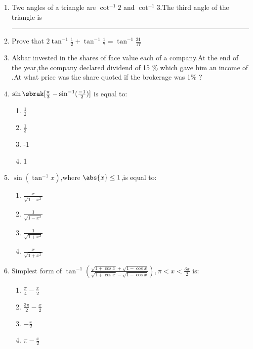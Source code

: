
\begin{enumerate}
\item Two angles of a triangle are  $\cot^{-1}2$ and $\cot^{-1}3$.The third angle of the
triangle is \rule{30pt}{1pt}

\item Prove that $2\tan^{-1}\frac{1}{2} + \tan^{-1}\frac{1}{7} = \tan^{-1}\frac{31}{17}$

\item Akbar invested  in the shares of face value  each of a company.At the end of the year,the company declared dividend of 15 \% which gave him an income of .At what price was the share quoted if the brokerage was 1\% ?

\item $ \sin \sbrak[\frac{\pi}{3}-\sin^{-1}(\frac{-1}{2})] $ is equal to:

\begin{enumerate}

 \item $\frac{1}{2}$
 \item $\frac{1}{3}$
 \item -1
 \item 1

\end{enumerate}

\item $ \sin(\tan^{-1}x)$,where $\abs{x} \le 1 $,is equal to:

\begin{enumerate}

	\item$\frac{x}{\sqrt{1-x^2}}$
	\item$\frac{1}{\sqrt{1-x^2}}$ 
	\item$\frac{1}{\sqrt{1+x^2}}$
	\item$\frac{x}{\sqrt{1+x^2}}$

\end{enumerate}  

\item Simplest form of $ \tan^{-1}(\frac{\sqrt{1+\cos x}+\sqrt{1-\cos x}}{\sqrt{1+\cos x}- \sqrt {1- \cos x}}) , \pi < x < \frac{3\pi}{2}$ is:

\begin{enumerate}

  \item$\frac{\pi}{4} - \frac{x}{2}$
  \item$\frac{3\pi}{2} - \frac{x}{2}$
  \item$-\frac{x}{2}$
  \item${\pi} - \frac{x}{2}$

\end{enumerate}
\end{enumerate}

